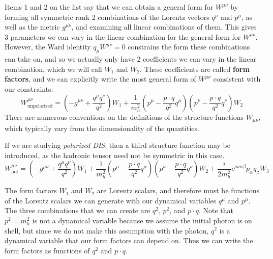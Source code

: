 \documentclass[11pt, oneside]{article}   	%
\theoremstyle{definition}
\begin{document}
Items 1 and 2 on the list say that we can obtain a general form for $W^{\mu\nu}$ by forming all symmetric rank 2 combinations 
of the Lorentz vectors $q^\mu$ and $p^\mu$, as well as the metric $g^{\mu\nu}$, and examining all linear combinations of 
them. This gives 3 parameters we can vary in the linear combination for the general form for $W^{\mu\nu}$. 
However, the Ward identity $q_\mu W^{\mu\nu} = 0$ constrains the form these combinations can take on, and so we actually 
only have 2 coefficients we can vary in the linear combination, which we will call $W_1$ and $W_2$. These coefficients are 
called \textbf{form factors}, and we can explicitly write the most general form of $W^{\mu\nu}$ consistent with our constraints:
\begin{equation}
	W^{\mu\nu}_\mathrm{unpolarized} = \left(-g^{\mu\nu} + \frac{q^\mu q^\nu}{q^2}\right) W_1 + \frac{1}{m_h^2}\left(p^\mu - 
	\frac{p\cdot q}{q^2}q^\mu\right)\left(p^\nu - \frac{p\cdot q}{q^2}q^\nu\right) W_2~
	\label{eq:form_factors}
\end{equation}
There are numerous conventions on the definitions of the structure functions $W_{\mu\nu}$, which typically vary from the 
dimensionality of the quantities. 

If we are studying \textit{polarized DIS}, then a third structure function may be introduced, as the hadronic tensor need not 
be symmetric in this case.
\begin{equation}
	W_\mathrm{pol}^{\mu\nu} = \left(-g^{\mu\nu} + \frac{q^\mu q^\nu}{q^2}\right) W_1 + \frac{1}{m_h^2}\left(p^\mu - 
	\frac{p\cdot q}{q^2}q^\mu\right)\left(p^\nu - \frac{p\cdot q}{q^2}q^\nu\right) W_2 + \frac{i}{2m_h^2} 
	\epsilon^{\mu\nu\alpha\beta}p_\alpha q_\beta W_3
\end{equation}

The form factors $W_1$ and $W_2$ are Lorentz scalars, and therefore must be functions of the Lorentz scalars we can 
generate with our dynamical variables $q^\mu$ and $p^\mu$. The three combinations that we can create are $q^2$, $p^2$, 
and $p\cdot q$. Note that $p^2 = m_h^2$ is not a dynamical variable because we assume the initial photon is on shell, but 
since we do not make this assumption with the photon, $q^2$ is a dynamical variable that our form factors can depend on. 
Thus we can write the form factors as functions of $q^2$ and $p\cdot q$. 
\end{document}
